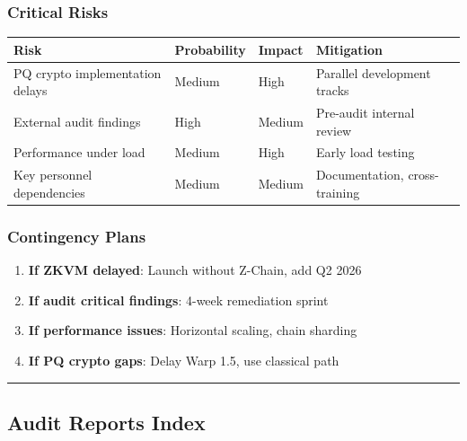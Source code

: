 \documentclass[
]{article}
\newcounter{none} %
\providecommand{\tightlist}{%
  \setlength{\itemsep}{0pt}\setlength{\parskip}{0pt}}
\begin{document}
\subsubsection{Critical Risks}\label{critical-risks}

{\def\LTcaptype{none} %
\begin{longtable}[]{@{}llll@{}}
\toprule\noalign{}
Risk & Probability & Impact & Mitigation \\
\midrule\noalign{}
\endhead
\bottomrule\noalign{}
\endlastfoot
PQ crypto implementation delays & Medium & High & Parallel development
tracks \\
External audit findings & High & Medium & Pre-audit internal review \\
Performance under load & Medium & High & Early load testing \\
Key personnel dependencies & Medium & Medium & Documentation,
cross-training \\
\end{longtable}
}

\subsubsection{Contingency Plans}\label{contingency-plans}

\begin{enumerate}
\def\labelenumi{\arabic{enumi}.}
\tightlist
\item
  \textbf{If ZKVM delayed}: Launch without Z-Chain, add Q2 2026
\item
  \textbf{If audit critical findings}: 4-week remediation sprint
\item
  \textbf{If performance issues}: Horizontal scaling, chain sharding
\item
  \textbf{If PQ crypto gaps}: Delay Warp 1.5, use classical path
\end{enumerate}

\begin{center}\rule{0.5\linewidth}{0.5pt}\end{center}

\subsection{Audit Reports Index}\label{audit-reports-index}
\end{document}

